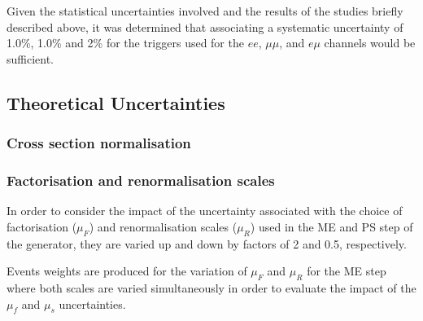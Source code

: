 %

Given the statistical uncertainties involved and the results of the studies briefly described above, it was determined that associating a systematic uncertainty of 1.0\%, 1.0\% and 2\% for the triggers used for the $ee$, $\mu\mu$, and $e \mu$ channels would be sufficient.

\subsection{Theoretical Uncertainties}\label{sec:theorySysts}
\subsubsection{Cross section normalisation}

\subsubsection{Factorisation and renormalisation scales}
In order to consider the impact of the uncertainty associated with the choice of factorisation ($\mu_{F}$) and renormalisation scales ($\mu_{R}$) used in the ME and PS step of the generator, they are varied up and down by factors of 2 and 0.5, respectively.



Events weights are produced for the variation of $\mu_{F}$ and $\mu_{R}$ for the ME step where both scales are varied simultaneously in order to evaluate the impact of the $\mu_{f}$ and $\mu_{s}$ uncertainties.

